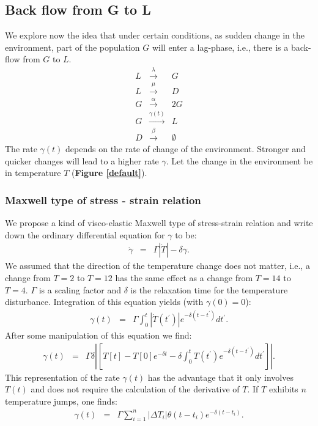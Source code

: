 \documentclass[10pt,A4paper]{article}
\begin{document}

\subsection{Back flow from G to L}

We explore now the idea that under certain conditions, as sudden change in the environment, part of the population $G$ will enter a lag-phase, i.e., there is a back-flow from $G$ to $L$. 
\begin{eqnarray}
L &\stackrel{\lambda}{\longrightarrow} & G\\
L &\stackrel{\mu}{\longrightarrow} & D\\
G &\stackrel{\alpha}{\longrightarrow} & 2G\\
G &\stackrel{\gamma(t)}{\longrightarrow} & L\\
D &\stackrel{\beta}{\longrightarrow} & \emptyset
\end{eqnarray}
The rate $\gamma(t)$ depends on the rate of change of the environment. Stronger and quicker changes will lead to a higher rate $\gamma$. 
Let the change in the environment be in temperature $T$ (\textbf{Figure \ref{default}}).

\subsubsection{Maxwell type of stress - strain relation}
We propose a kind of visco-elastic Maxwell type of stress-strain relation and write down the ordinary differential equation for $\gamma$ to be:
\begin{eqnarray}
\dot{\gamma} &=& \Gamma \left |\dot{T}\right |-\delta \gamma.
\end{eqnarray}
We assumed that the direction of the temperature change does not matter, i.e., a change from $T=2$ to $T=12$ has the same effect as a change from $T=14$ to $T=4$. 
$\Gamma$ is a scaling factor and $\delta$ is the relaxation time for the temperature disturbance. 
Integration of this equation yields (with $\gamma(0)=0$):
\begin{eqnarray}
\gamma(t) &=& \Gamma \int_0^t \left |\dot{T}(t^{\prime})\right |e^{-\delta (t-t^{\prime})}dt^{\prime}.
\end{eqnarray}
After some manipulation of this equation we find:
\begin{eqnarray}
\gamma(t) &=& \Gamma\delta\left |\left[T[t]-T[0]e^{-\delta t}-\delta \int_0^t T(t^{\prime})e^{-\delta (t-t^{\prime})}dt^{\prime}\right]\right |.
\end{eqnarray}
This representation of the rate $\gamma(t)$ has the advantage that it only involves $T(t)$ and does not require the calculation of the derivative of $T$. 
If $T$ exhibits $n$ temperature jumps, one finds:
\begin{eqnarray}
\gamma(t) &=& \Gamma\sum_{i=1}^n \left |\Delta T_i \right |\theta(t-t_i)e^{-\delta(t-t_i)}.
\end{eqnarray}
\end{document}
